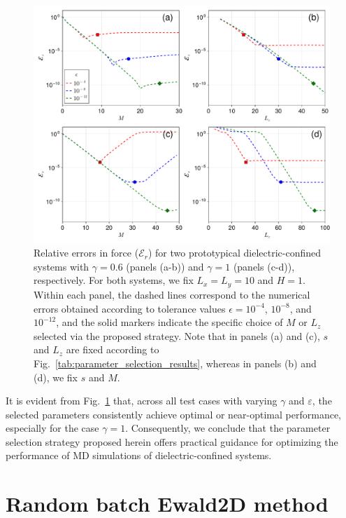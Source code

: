 \begin{figure}[!htbp]
    \centering
    \includegraphics[width=0.92\linewidth]{figs/error_parameter_selection_force.pdf}
    \caption{
        Relative errors in force ($\mathcal{E}_r$) for two prototypical dielectric-confined systems with $\gamma=0.6$ (panels (a-b)) and $\gamma = 1$ (panels (c-d)), respectively.
        For both systems, we fix $L_x=L_y=10$ and $H = 1$. 
        Within each panel, the dashed lines correspond to the numerical errors obtained according to tolerance values $\epsilon = 10^{-4}$, $10^{-8}$, and $10^{-12}$, and the solid markers indicate the specific choice of $M$ or $L_z$ selected via the proposed strategy.
        Note that in panels (a) and (c), $s$ and $L_z$ are fixed according to Fig.~\ref{tab:parameter_selection_results}, whereas in panels (b) and (d), we fix $s$ and $M$.
    }
    \label{fig:error_parameter_selection_force}
\end{figure}
It is evident from Fig.~\ref{fig:error_parameter_selection_force} that, across all test cases with varying $\gamma$ and $\varepsilon$, the selected parameters consistently achieve optimal or near-optimal performance, especially for the case $\gamma = 1$. 
Consequently, we conclude that the parameter selection strategy proposed herein offers practical guidance for optimizing the performance of MD simulations of dielectric-confined systems.

\section{Random batch Ewald2D method}\label{sec::RBE2D}

